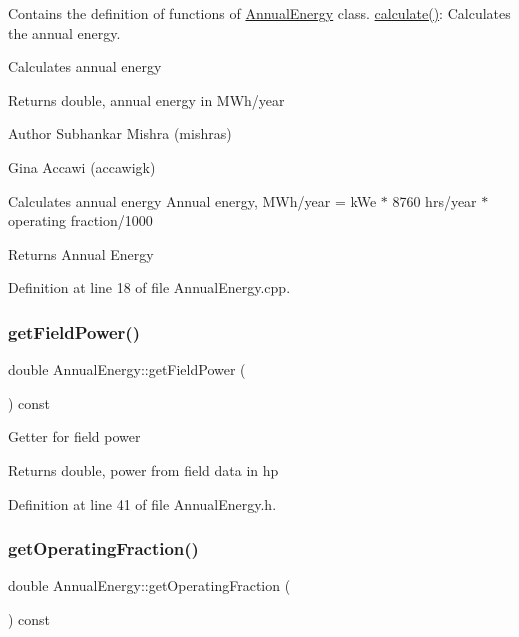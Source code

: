 Contains the definition of functions of \hyperlink{class_annual_energy}{Annual\+Energy} class. \hyperlink{class_annual_energy_ab599860ffb32ce20a1042a3e9d2ad57f}{calculate()}\+: Calculates the annual energy. 

Calculates annual energy \begin{DoxyReturn}{Returns}
double, annual energy in M\+Wh/year
\end{DoxyReturn}
\begin{DoxyAuthor}{Author}
Subhankar Mishra (mishras) 

Gina Accawi (accawigk) 
\end{DoxyAuthor}
Calculates annual energy Annual energy, M\+Wh/year = k\+We $\ast$ 8760 hrs/year $\ast$ operating fraction/1000 \begin{DoxyReturn}{Returns}
Annual Energy 
\end{DoxyReturn}


Definition at line 18 of file Annual\+Energy.\+cpp.

\mbox{\label{class_annual_energy_a52aa52274243f578ea7f92d27707cacb}} 
\subsubsection{\texorpdfstring{get\+Field\+Power()}{getFieldPower()}}
{\footnotesize\ttfamily double Annual\+Energy\+::get\+Field\+Power (\begin{DoxyParamCaption}{ }\end{DoxyParamCaption}) const\hspace{0.3cm}{\ttfamily [inline]}}

Getter for field power \begin{DoxyReturn}{Returns}
double, power from field data in hp 
\end{DoxyReturn}


Definition at line 41 of file Annual\+Energy.\+h.

\mbox{\label{class_annual_energy_a51c2bd68a5268ec9bafe3c70b3a7a6ad}} 
\subsubsection{\texorpdfstring{get\+Operating\+Fraction()}{getOperatingFraction()}}
{\footnotesize\ttfamily double Annual\+Energy\+::get\+Operating\+Fraction (\begin{DoxyParamCaption}{ }\end{DoxyParamCaption}) const\hspace{0.3cm}{\ttfamily [inline]}}

